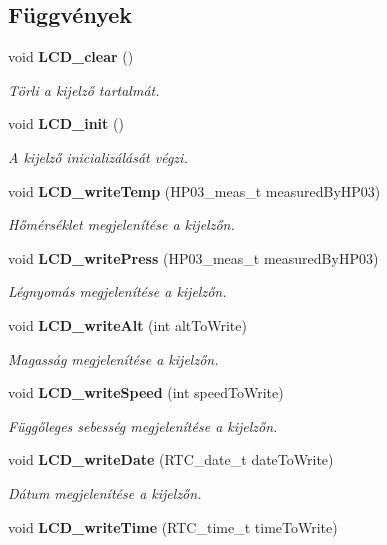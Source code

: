 \subsection*{Függvények}
\begin{DoxyCompactItemize}
\item 
void {\bf L\-C\-D\-\_\-clear} ()
\begin{DoxyCompactList}\small\item\em Törli a kijelző tartalmát. \end{DoxyCompactList}\item 
void {\bf L\-C\-D\-\_\-init} ()
\begin{DoxyCompactList}\small\item\em A kijelző inicializálását végzi. \end{DoxyCompactList}\item 
void {\bf L\-C\-D\-\_\-write\-Temp} (H\-P03\-\_\-meas\-\_\-t measured\-By\-H\-P03)
\begin{DoxyCompactList}\small\item\em Hőmérséklet megjelenítése a kijelzőn. \end{DoxyCompactList}\item 
void {\bf L\-C\-D\-\_\-write\-Press} (H\-P03\-\_\-meas\-\_\-t measured\-By\-H\-P03)
\begin{DoxyCompactList}\small\item\em Légnyomás megjelenítése a kijelzőn. \end{DoxyCompactList}\item 
void {\bf L\-C\-D\-\_\-write\-Alt} (int alt\-To\-Write)
\begin{DoxyCompactList}\small\item\em Magasság megjelenítése a kijelzőn. \end{DoxyCompactList}\item 
void {\bf L\-C\-D\-\_\-write\-Speed} (int speed\-To\-Write)
\begin{DoxyCompactList}\small\item\em Függőleges sebesség megjelenítése a kijelzőn. \end{DoxyCompactList}\item 
void {\bf L\-C\-D\-\_\-write\-Date} (R\-T\-C\-\_\-date\-\_\-t date\-To\-Write)
\begin{DoxyCompactList}\small\item\em Dátum megjelenítése a kijelzőn. \end{DoxyCompactList}\item 
void {\bf L\-C\-D\-\_\-write\-Time} (R\-T\-C\-\_\-time\-\_\-t time\-To\-Write)

\end{DoxyCompactItemize}
